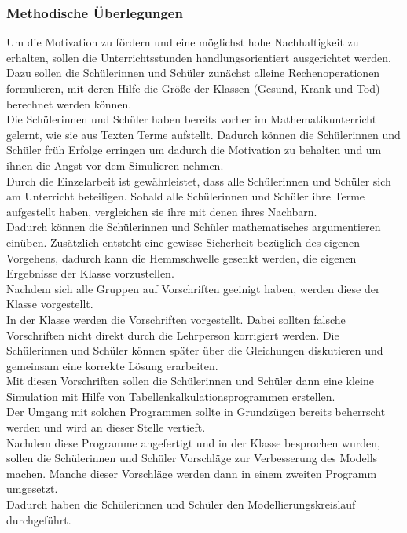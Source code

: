\subsubsection{Methodische Überlegungen}
Um die Motivation zu fördern und eine möglichst hohe Nachhaltigkeit zu erhalten, sollen die Unterrichtsstunden handlungsorientiert ausgerichtet werden. Dazu sollen die Schülerinnen und Schüler zunächst alleine Rechenoperationen formulieren, mit deren Hilfe die Größe der Klassen (Gesund, Krank und Tod) berechnet werden können.\\
Die Schülerinnen und Schüler haben bereits vorher im Mathematikunterricht gelernt, wie sie aus Texten Terme aufstellt. Dadurch können die Schülerinnen und Schüler früh Erfolge erringen um dadurch die Motivation zu behalten und um ihnen die Angst vor dem Simulieren nehmen.\\
Durch die Einzelarbeit ist gewährleistet, dass alle Schülerinnen und Schüler sich am Unterricht beteiligen. Sobald alle Schülerinnen und Schüler ihre Terme aufgestellt haben, vergleichen sie ihre mit denen ihres Nachbarn.\\
Dadurch können die Schülerinnen und Schüler mathematisches argumentieren einüben. Zusätzlich entsteht eine gewisse Sicherheit bezüglich des eigenen Vorgehens, dadurch kann die Hemmschwelle gesenkt werden, die eigenen Ergebnisse der Klasse vorzustellen.\\
Nachdem sich alle Gruppen auf Vorschriften geeinigt haben, werden diese der Klasse vorgestellt.\\
In der Klasse werden die Vorschriften vorgestellt. Dabei sollten falsche Vorschriften nicht direkt durch die Lehrperson korrigiert werden. Die Schülerinnen und Schüler können später über die Gleichungen diskutieren und gemeinsam eine korrekte Lösung erarbeiten.\\
Mit diesen Vorschriften sollen die Schülerinnen und Schüler dann eine kleine Simulation mit Hilfe von Tabellenkalkulationsprogrammen erstellen.\\
Der Umgang mit solchen Programmen sollte in Grundzügen bereits beherrscht werden und wird an dieser Stelle vertieft.\\
Nachdem diese Programme angefertigt und in der Klasse besprochen wurden, sollen die Schülerinnen und Schüler Vorschläge zur Verbesserung des Modells machen. Manche dieser Vorschläge werden dann in einem zweiten Programm umgesetzt.\\
Dadurch haben die Schülerinnen und Schüler den Modellierungskreislauf durchgeführt. 

